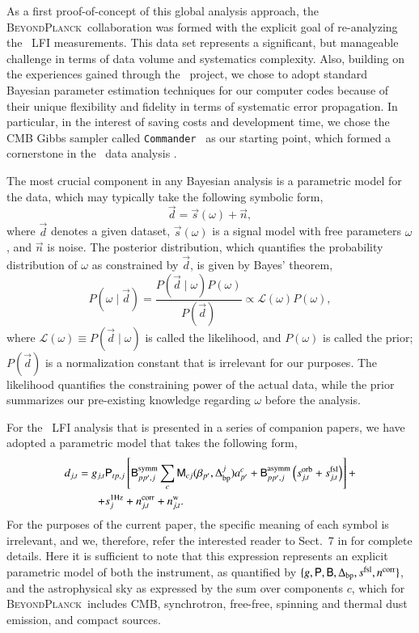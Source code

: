\documentclass[twocolumn]{aa}
\def\commander{\texttt{Commander}}
\renewcommand{\d}[0]{\vec{d}}
\newcommand{\n}[0]{\vec{n}}
\newcommand{\s}[0]{\vec{s}}
\newcommand{\B}[0]{\tens{B}}
\newcommand{\M}[0]{\tens{M}}
\renewcommand{\P}[0]{\tens{P}}
\newcommand{\Dbp}[0]{\Delta_{\mathrm{bp}}}
\newcommand{\BP}{\textsc{BeyondPlanck}}
\begin{document}
As a first proof-of-concept of this global analysis approach, the \BP\ collaboration \citep{bp01} was formed with the explicit goal of re-analyzing the \Planck\ LFI measurements. This data set represents a significant, but manageable challenge in terms of data volume and systematics complexity. Also, building on the experiences gained through the \Planck\ project, we chose to adopt standard Bayesian parameter estimation techniques for our computer codes because of their unique flexibility and fidelity in terms of systematic error propagation. In particular, in the interest of saving costs and development time, we chose the CMB Gibbs sampler called \commander\ \citep{eriksen:2004,eriksen2008,seljebotn:2019} as our starting point, which formed a cornerstone in the \Planck\ data analysis \citep{planck2016-l04,planck2016-l05,planck2016-l06}.

The most crucial component in any Bayesian analysis is a parametric model for the data, which may typically take the following symbolic form,
\begin{equation}
\d = \s(\omega) + \n,
\end{equation}
where $\d$ denotes a given dataset, $\s(\omega)$ is a signal model
with free parameters $\omega$, and $\n$ is noise. The posterior
distribution, which quantifies the probability distribution of
$\omega$ as constrained by $\d$, is given by Bayes' theorem,
\begin{equation}
  P(\omega\mid \d) = \frac{P(\d\mid \omega)P(\omega)}{P(\d)} \propto
  \mathcal{L}(\omega)P(\omega),
  \label{eq:jointpost}
\end{equation}
where $\mathcal{L}(\omega)\equiv P(\d\mid \omega)$ is called the
likelihood, and $P(\omega)$ is called the prior; $P(\d)$ is a
normalization constant that is irrelevant for our purposes. The
likelihood quantifies the constraining power of the actual data, while
the prior summarizes our pre-existing knowledge regarding $\omega$
before the analysis.

For the \Planck\ LFI analysis that is presented in a series of
companion papers, we have adopted a parametric model that takes the
following form,
\begin{equation}
  \begin{split}
    d_{j,t} = g_{j,t}&\P_{tp,j}\left[\B^{\mathrm{symm}}_{pp',j}\sum_{c}
      \M_{cj}(\beta_{p'}, \Dbp^{j})a^c_{p'}  + \B^{\mathrm{asymm}}_{pp',j}\left(s^{\mathrm{orb}}_{j,t}  
      + s^{\mathrm{fsl}}_{j,t}\right)\right] + \\
    + &s^{\mathrm{1\mathrm{Hz}}}_{j} + 
    n^{\mathrm{corr}}_{j,t} + n^{\mathrm{w}}_{j,t}.
  \end{split}
  \label{eq:todmodel}
\end{equation}
For the purposes of the current paper, the specific meaning of each symbol is irrelevant, and we, therefore, refer the interested reader to Sect.~7 in \citet{bp01} for complete details. Here it is sufficient to note that this expression represents an explicit parametric model of both the instrument, as quantified by $\{g, \P, \B, \Dbp, s^{\mathrm{fsl}}, n^{\mathrm{corr}}\}$, and the astrophysical sky as expressed by the sum over components $c$, which for \BP\ includes CMB, synchrotron, free-free, spinning and thermal dust emission, and compact sources.
\end{document}
